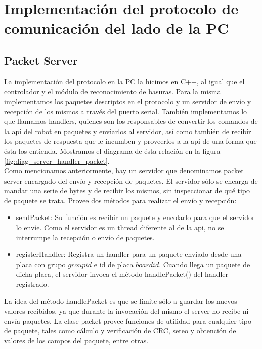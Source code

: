 \section[Implementaci\'on del protocolo en PC]{Implementaci\'on del protocolo de comunicaci\'on del lado de la PC}
\subsection{Packet Server}
La implementaci\'on del protocolo en la PC la hicimos en C++, al igual que
el controlador y el m\'odulo de reconocimiento de basuras. Para la misma
implementamos los paquetes descriptos en el protocolo y un servidor de
env\'io y recepci\'on de los mismos a trav\'es del puerto serial. Tambi\'en
implementamos lo que llamamos handlers, quienes son los responsables de
convertir los comandos de la api del robot en paquetes y enviarlos al
servidor, as\'i como tambi\'en de recibir los paquetes de respuesta que
le incumben y proveerlos a la api de una forma que \'esta los entienda.
Mostramos el diagrama de \'esta relaci\'on en la figura
\ref{fig:diag_server_handler_packet}.
\\\indent
Como mencionamos anteriormente, hay un servidor que denominamos packet
server encargado del env\'io y recepci\'on de paquetes. El servidor s\'olo
se encarga de mandar una serie de bytes y de recibir los mismos, sin
inspeccionar de qu\'e tipo de paquete se trata. Provee
dos m\'etodos para realizar el env\'io y recepci\'on:
\begin{itemize}
	\item{sendPacket:} Su funci\'on es recibir un paquete y encolarlo para
		que el servidor lo env\'ie. Como el servidor es un thread diferente
		al de la api, no se interrumpe la recepci\'on o env\'io de paquetes.
	\item{registerHandler:} Registra un handler para un paquete enviado desde
		una placa con grupo $groupid$ e id de placa $boardid$. Cuando llega
		un paquete de dicha placa, el servidor invoca el m\'etodo
		handlePacket() del handler registrado.
\end{itemize}
La idea del m\'etodo handlePacket es que se limite s\'olo a guardar los
nuevos valores recibidos, ya que durante la invocaci\'on del mismo el
server no recibe ni env\'ia paquetes.
La clase packet provee funciones de utilidad para cualquier tipo de
paquete, tales como c\'alculo y verificaci\'on de CRC, seteo y obtenci\'on
de valores de los campos del paquete, entre otras.

